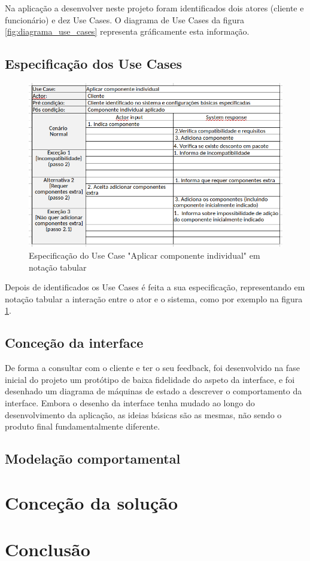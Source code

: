 \documentclass{llncs}
\begin{document}
Na aplicação a desenvolver neste projeto foram identificados dois atores (cliente e funcionário) e dez Use Cases. O diagrama de Use Cases da figura \ref{fig:diagrama_use_cases} representa gráficamente esta informação.

\subsection{Especificação dos Use Cases}

\begin{figure}
\begin{center}
\includegraphics[scale=0.40]{aplicar_componente_tabular.png} 
\end{center}
\caption{\label{fig:notacao_tabular}Especificação do Use Case "Aplicar componente individual" em notação tabular }
\end{figure} 

Depois de identificados os Use Cases é feita a sua especificação, representando em notação tabular a interação entre o ator e o sistema, como por exemplo na figura \ref{fig:notacao_tabular}.

\subsection{Conceção da interface}

De forma a consultar com o cliente e ter o seu feedback, foi desenvolvido na fase inicial do projeto um protótipo de baixa fidelidade do aspeto da interface, e foi desenhado um diagrama de máquinas de estado a descrever o comportamento da interface. Embora o desenho da interface tenha mudado ao longo do desenvolvimento da aplicação, as ideias básicas são as mesmas, não sendo o produto final fundamentalmente diferente.

\subsection{Modelação comportamental}

\clearpage
\section{Conceção da solução} %




\clearpage
\section{Conclusão}
\end{document}
